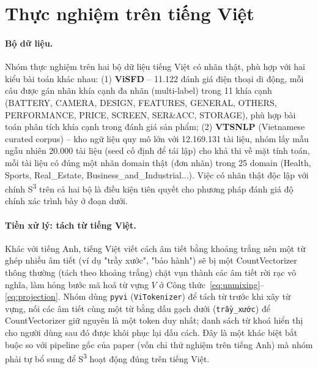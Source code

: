 \documentclass[11pt]{article}
\begin{document}
\section{Thực nghiệm trên tiếng Việt}
\label{sec:vn-experiments}

\paragraph{Bộ dữ liệu.} Nhóm thực nghiệm trên hai bộ dữ liệu tiếng Việt có
nhãn thật, phù hợp với hai kiểu bài toán khác nhau: (1) \textbf{ViSFD} --
11.122 đánh giá điện thoại di động, mỗi câu được gán nhãn khía cạnh đa nhãn
(multi-label) trong 11 khía cạnh (BATTERY, CAMERA, DESIGN, FEATURES,
GENERAL, OTHERS, PERFORMANCE, PRICE, SCREEN, SER\&ACC, STORAGE), phù hợp
bài toán phân tích khía cạnh trong đánh giá sản phẩm; (2) \textbf{VTSNLP}
(Vietnamese curated corpus) -- kho ngữ liệu quy mô lớn với 12.169.131 tài
liệu, nhóm lấy mẫu ngẫu nhiên 20.000 tài liệu (seed cố định để tái lập)
cho khả thi về mặt tính toán, mỗi tài liệu có đúng một nhãn domain thật
(đơn nhãn) trong 25 domain (Health, Sports, Real\_Estate,
Business\_and\_Industrial...). Việc có nhãn thật độc lập với chính
S\textsuperscript{3} trên cả hai bộ là điều kiện tiên quyết cho phương
pháp đánh giá độ chính xác trình bày ở đoạn dưới.

\paragraph{Tiền xử lý: tách từ tiếng Việt.} Khác với tiếng Anh, tiếng Việt
viết cách âm tiết bằng khoảng trắng nên một từ ghép nhiều âm tiết (ví dụ
"trầy xước", "bảo hành") sẽ bị một CountVectorizer thông thường (tách theo
khoảng trắng) chặt vụn thành các âm tiết rời rạc vô nghĩa, làm hỏng bước mã
hoá từ vựng $V$ ở Công thức~\ref{eq:unmixing}--\ref{eq:projection}. Nhóm
dùng \texttt{pyvi} (\texttt{ViTokenizer}) để tách từ trước khi xây từ
vựng, nối các âm tiết cùng một từ bằng dấu gạch dưới (\texttt{trầy\_xước})
để CountVectorizer giữ nguyên là một token duy nhất; danh sách từ khoá hiển
thị cho người dùng sau đó được khôi phục lại dấu cách. Đây là một khác
biệt bắt buộc so với pipeline gốc của paper (vốn chỉ thử nghiệm trên tiếng
Anh) mà nhóm phải tự bổ sung để S\textsuperscript{3} hoạt động đúng trên
tiếng Việt.
\end{document}
